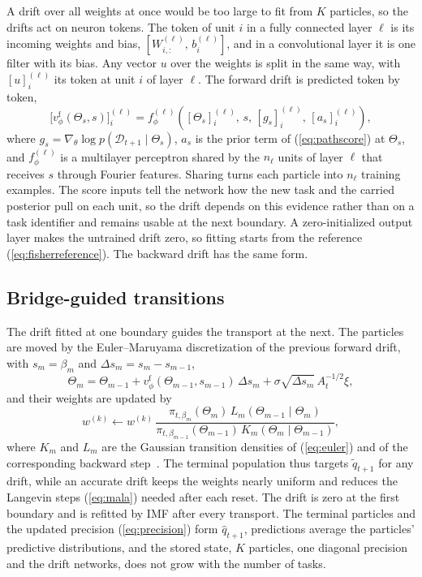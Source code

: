 A drift over all weights at once would be too large to fit from $K$ particles,
so the drifts act on neuron tokens. The token of unit $i$ in a fully connected
layer $\ell$ is its incoming weights and bias,
$[W^{(\ell)}_{i,:},\,b^{(\ell)}_i]$, and in a convolutional layer it is one
filter with its bias. Any vector $u$ over the weights is split in the same way,
with $[u]^{(\ell)}_i$ its token at unit $i$ of layer $\ell$. The forward drift is
predicted token by token,
\begin{equation}
    \big[v^{\mathrm{f}}_\phi(\Theta_s,s)\big]^{(\ell)}_i
    =f^{(\ell)}_\phi\!\left([\Theta_s]^{(\ell)}_i,\,s,\,[g_s]^{(\ell)}_i,\,
    [a_s]^{(\ell)}_i\right),
    \label{eq:tokendrift}
\end{equation}
where $g_s=\nabla_\theta\log p(\mathcal{D}_{t+1}\mid\Theta_s)$, $a_s$ is the
prior term of (\ref{eq:pathscore}) at $\Theta_s$, and $f^{(\ell)}_\phi$ is a
multilayer perceptron shared by the $n_\ell$ units of layer $\ell$ that receives
$s$ through Fourier features. Sharing turns each particle into $n_\ell$ training
examples. The score inputs tell the network how the new task and the carried
posterior pull on each unit, so the drift depends on this evidence rather than
on a task identifier and remains usable at the next boundary. A zero-initialized
output layer makes the untrained drift zero, so fitting starts from the
reference (\ref{eq:fisherreference}). The backward drift has the same form.

\subsection{Bridge-guided transitions}
\label{sec:transition}

The drift fitted at one boundary guides the transport at the next. The particles
are moved by the Euler--Maruyama discretization of the previous forward drift,
with $s_m=\beta_m$ and $\Delta s_m=s_m-s_{m-1}$,
\begin{equation}
    \Theta_{m}=\Theta_{m-1}+v^{\mathrm{f}}_\phi(\Theta_{m-1},s_{m-1})\,\Delta s_m
    +\sigma\sqrt{\Delta s_m}\,A_t^{-1/2}\xi,
    \label{eq:euler}
\end{equation}
and their weights are updated by
\begin{equation}
    w^{(k)}\leftarrow w^{(k)}\,
    \frac{\pi_{t,\beta_m}(\Theta_m)\,L_m(\Theta_{m-1}\mid\Theta_m)}
         {\pi_{t,\beta_{m-1}}(\Theta_{m-1})\,K_m(\Theta_m\mid\Theta_{m-1})},
    \label{eq:bridgeweight}
\end{equation}
where $K_m$ and $L_m$ are the Gaussian transition densities of (\ref{eq:euler})
and of the corresponding backward step~\cite{delmoral2006smc}. The terminal
population thus targets $\tilde q_{t+1}$ for any drift, while an accurate drift
keeps the weights nearly uniform and reduces the Langevin steps (\ref{eq:mala})
needed after each reset. The drift is zero at the first boundary and is refitted
by IMF after every transport. The terminal particles and the updated precision
(\ref{eq:precision}) form $\hat q_{t+1}$, predictions average the particles'
predictive distributions, and the stored state, $K$ particles, one diagonal
precision and the drift networks, does not grow with the number of tasks.
